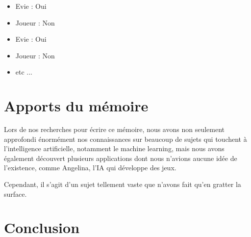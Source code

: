 \documentclass[a4paper, 12pt]{article} %
\begin{document}
\begin{itemize}
	\item Evie : Oui
	\item Joueur : Non
	\item Evie : Oui
	\item Joueur : Non
	\item etc ...
\end{itemize}


\newpage
\section{Apports du mémoire}
Lors de nos recherches pour écrire ce mémoire, nous avons non seulement approfondi énormément nos connaissances sur beaucoup de sujets qui touchent à l'intelligence artificielle, notamment le machine learning, mais nous avons également découvert plusieurs applications dont nous n'avions aucune idée de l'existence, comme Angelina, l'IA qui développe des jeux.

Cependant, il s'agit d'un sujet tellement vaste que n'avons fait qu'en gratter la surface.


\newpage
\section{Conclusion}



\newpage



\end{document}
